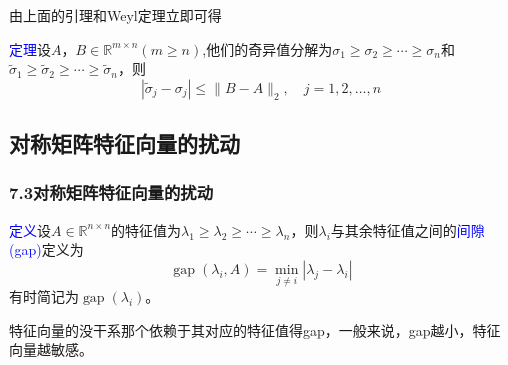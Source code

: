 \documentclass[notheorems,serif]{beamer}
\begin{document}
\begin{frame}

由上面的引理和Weyl定理立即可得

\textcolor{blue}{定理}\quad 设$A，B\in \mathbb{R}^{m \times n}(m \geq n)$,他们的奇异值分解为$\sigma_{1} \geq \sigma_{2} \geq \cdots \geq \sigma_{n}$和$\tilde{\sigma}_{1} \geq \tilde{\sigma}_{2} \geq \cdots \geq \tilde{\sigma}_{n}$，则$$
\left|\tilde{\sigma}_{j}-\sigma_{j}\right| \leq\|B-A\|_{2}, \quad j=1,2, \ldots, n
$$
\end{frame}
\subsection*{对称矩阵特征向量的扰动}
\begin{frame}
\frametitle{7.3\qquad 对称矩阵特征向量的扰动}


\textcolor{blue}{定义}\quad 设$A\in \mathbb{R}^{n \times n}$的特征值为$\lambda_{1} \geq \lambda_{2} \geq \cdots \geq \lambda_{n}$，则$\lambda_{i}$与其余特征值之间的\textcolor{blue}{间隙(gap)}定义为
$$
\operatorname{gap}\left(\lambda_{i}, A\right)=\min _{j \neq i}\left|\lambda_{j}-\lambda_{i}\right|
$$有时简记为$
\operatorname{gap}(\lambda_{i})$。

特征向量的没干系那个依赖于其对应的特征值得gap，一般来说，gap越小，特征向量越敏感。
\end{frame}
\end{document}
